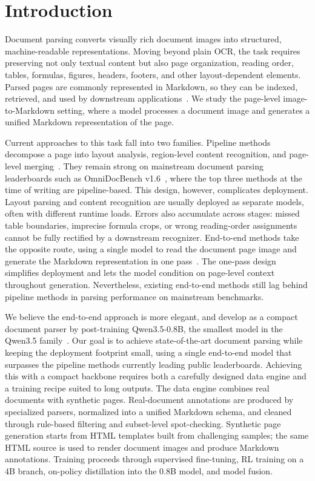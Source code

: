 \section{Introduction}

Document parsing converts visually rich document images into structured, machine-readable representations. Moving beyond plain OCR, the task requires preserving not only textual content but also page organization, reading order, tables, formulas, figures, headers, footers, and other layout-dependent elements. Parsed pages are commonly represented in Markdown, so they can be indexed, retrieved, and used by downstream applications~\cite{omnidocbench,puredocbench,paddleocrvl16,mineru25,glmocr}. We study the page-level image-to-Markdown setting, where a model processes a document image and generates a unified Markdown representation of the page.

Current approaches to this task fall into two families. Pipeline methods decompose a page into layout analysis, region-level content recognition, and page-level merging~\cite{paddleocrvl16,mineru25pro,glmocr}. They remain strong on mainstream document parsing leaderboards such as OmniDocBench v1.6~\cite{omnidocbench,omnidocbenchLeaderboard}, where the top three methods at the time of writing are pipeline-based. This design, however, complicates deployment. Layout parsing and content recognition are usually deployed as separate models, often with different runtime loads. Errors also accumulate across stages: missed table boundaries, imprecise formula crops, or wrong reading-order assignments cannot be fully rectified by a downstream recognizer. End-to-end methods take the opposite route, using a single model to read the document page image and generate the Markdown representation in one pass~\cite{hunyuanocr15,unlimitedocr,jiang2026ovisocr}. The one-pass design simplifies deployment and lets the model condition on page-level context throughout generation. Nevertheless, existing end-to-end methods still lag behind pipeline methods in parsing performance on mainstream benchmarks.

We believe the end-to-end approach is more elegant, and develop \ours{} as a compact document parser by post-training Qwen3.5-0.8B, the smallest model in the Qwen3.5 family~\cite{qwen35}. Our goal is to achieve state-of-the-art document parsing while keeping the deployment footprint small, using a single end-to-end model that surpasses the pipeline methods currently leading public leaderboards. Achieving this with a compact backbone requires both a carefully designed data engine and a training recipe suited to long outputs. The data engine combines real documents with synthetic pages. Real-document annotations are produced by specialized parsers, normalized into a unified Markdown schema, and cleaned through rule-based filtering and subset-level spot-checking. Synthetic page generation starts from HTML templates built from challenging samples; the same HTML source is used to render document images and produce Markdown annotations. Training proceeds through supervised fine-tuning, RL training on a 4B branch, on-policy distillation into the 0.8B model, and model fusion.

